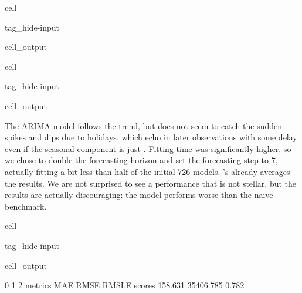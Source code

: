 \documentclass[letterpaper,10pt,english]{jupyterBook}
\begin{document}
\begin{sphinxuseclass}{cell}
\begin{sphinxuseclass}{tag_hide-input}
\begin{sphinxuseclass}{cell_output}
\noindent{}

\end{sphinxuseclass}
\end{sphinxuseclass}
\end{sphinxuseclass}
\begin{sphinxuseclass}{cell}
\begin{sphinxuseclass}{tag_hide-input}
\begin{sphinxuseclass}{cell_output}
\noindent{}

\end{sphinxuseclass}
\end{sphinxuseclass}
\end{sphinxuseclass}
\sphinxAtStartPar
The ARIMA model follows the trend, but does not seem to catch the sudden spikes and dips due to holidays, which echo in later observations with some delay \sphinxhyphen{} even if the seasonal component is just . Fitting time was significantly higher, so we chose to double the forecasting horizon and set the forecasting step to 7, actually fitting a bit less than half of the initial 726 models. ’s  already averages the results. We are not surprised to see a performance that is not stellar, but the results are actually discouraging: the model performs worse than the naive benchmark.

\begin{sphinxuseclass}{cell}
\begin{sphinxuseclass}{tag_hide-input}
\begin{sphinxuseclass}{cell_output}
\begin{sphinxVerbatim}[commandchars=\\\{\}]
              0         1      2
metrics     MAE      RMSE  RMSLE
scores  158.631 35406.785  0.782
\end{sphinxVerbatim}

\end{sphinxuseclass}
\end{sphinxuseclass}
\end{sphinxuseclass}
\end{document}

